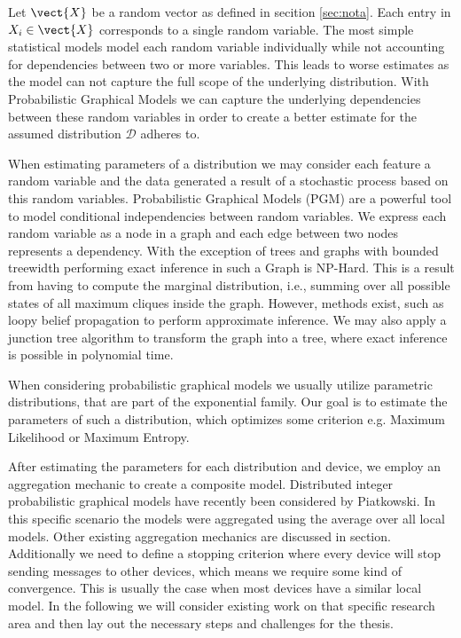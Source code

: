 Let $\vect{X}$ be a random vector as defined in secition \ref{sec:nota}. 
Each entry in $X_i \in \vect{X}$ corresponds to a single random variable.
The most simple statistical models model each random variable individually while not accounting for dependencies between two or more variables.
This leads to worse estimates as the model can not capture the full scope of the underlying distribution.
With Probabilistic Graphical Models we can capture the underlying dependencies between these random variables in order to create a better estimate for the assumed distribution $\mathcal{D}$ adheres to.

When estimating parameters of a distribution we may consider each feature a random variable and the data generated a result of a stochastic process based on this random variables.
Probabilistic Graphical Models (PGM) are a powerful tool to model conditional independencies between random variables. 
We express each random variable as a node in a graph and each edge between two nodes represents a dependency. 
With the exception of trees and graphs with bounded treewidth performing exact inference in such a Graph is NP-Hard.
This is a result from having to compute the marginal distribution, i.e., summing over all possible states of all maximum cliques inside the graph.
However, methods exist, such as loopy belief propagation to perform approximate inference.
We may also apply a junction tree algorithm to transform the graph into a tree, where exact inference is possible in polynomial time.

When considering probabilistic graphical models we usually utilize parametric distributions, that are part of the exponential family. 
Our goal is to estimate the parameters of such a distribution, which optimizes some criterion e.g. Maximum Likelihood or Maximum Entropy.


After estimating the parameters for each distribution and device, we employ an aggregation mechanic to create a composite model.
Distributed integer probabilistic graphical models \cite{piatkowski2019distributed} have recently been considered by Piatkowski.
In this specific scenario the models were aggregated using the average over all local models.
Other existing aggregation mechanics are discussed in section.
Additionally we need to define a stopping criterion where every device will stop sending messages to other devices, which means we require some kind of convergence.
This is usually the case when most devices have a similar local model.
In the following we will consider existing work on that specific research area and then lay out the necessary steps and challenges for the thesis.

